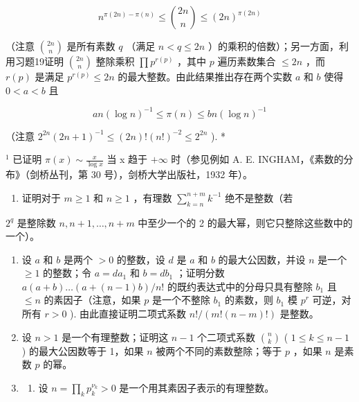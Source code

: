 \[
n ^ {\pi (2 n) - \pi (n)} \leqslant \binom {2 n} {n} \leqslant (2 n) ^ {\pi (2 n)}
\]

（注意 \(\binom{2n}{n}\) 是所有素数 \(q\) （满足 \(n < q \leqslant 2n\) ）的乘积的倍数）；另一方面，利用习题19证明 \(\binom{2n}{n}\) 整除乘积 \(\prod p^{r(p)}\) ，其中 \(p\) 遍历素数集合 \(\leqslant 2n\) ，而 \(r(p)\) 是满足 \(p^{r(p)} \leqslant 2n\) 的最大整数。由此结果推出存在两个实数 \(a\) 和 \(b\) 使得 \(0 < a < b\) 且

\[
a n (\log n) ^ {- 1} \leqslant \pi (n) \leqslant b n (\log n) ^ {- 1}
\]

（注意 \(2^{2n}(2n + 1)^{-1} \leqslant (2n)! (n!)^{-2} \leqslant 2^{2n}\) ). *

\(^{1}\) 已证明 \(\pi(x) \sim \frac{x}{\log x}\) 当 x 趋于 \(+\infty\) 时（参见例如 A. E. INGHAM，《素数的分布》（剑桥丛刊，第 30 号），剑桥大学出版社，1932 年）。

\begin{enumerate}
\def\labelenumi{\arabic{enumi})}
\setcounter{enumi}{20}
\tightlist
\item
  证明对于 \(m \geqslant 1\) 和 \(n \geqslant 1\) ，有理数 \(\sum_{k=n}^{n+m} k^{-1}\) 绝不是整数（若
\end{enumerate}

\(2^{q}\) 是整除数 \(n, n+1, \ldots, n+m\) 中至少一个的 2 的最大幂，则它只整除这些数中的一个）。

\begin{enumerate}
\def\labelenumi{\arabic{enumi})}
\setcounter{enumi}{21}
\item
  设 \(a\) 和 \(b\) 是两个 \(> 0\) 的整数，设 \(d\) 是 \(a\) 和 \(b\) 的最大公因数，并设 \(n\) 是一个 \(\geqslant 1\) 的整数；令 \(a = da_1\) 和 \(b = db_1\) ；证明分数 \(a(a + b) \ldots (a + (n - 1)b) / n!\) 的既约表达式中的分母只具有整除 \(b_1\) 且 \(\leqslant n\) 的素因子（注意，如果 \(p\) 是一个不整除 \(b_1\) 的素数，则 \(b_1\) 模 \(p^r\) 可逆，对所有 \(r > 0\) ). 由此直接证明二项式系数 \(n! / (m!(n - m)! )\) 是整数。
\item
  设 \(n > 1\) 是一个有理整数；证明这 \(n - 1\) 个二项式系数 \(\binom{n}{k}\) ( \(1 \leqslant k \leqslant n - 1\) ) 的最大公因数等于 1，如果 \(n\) 被两个不同的素数整除；等于 \(p\) ，如果 \(n\) 是素数 \(p\) 的幂。
\item
  \begin{enumerate}
  \def\labelenumii{\alph{enumii})}
  \tightlist
  \item
    设 \(n = \prod_{k} p_k^{\nu_k} > 0\) 是一个用其素因子表示的有理整数。
  \end{enumerate}
\end{enumerate}


